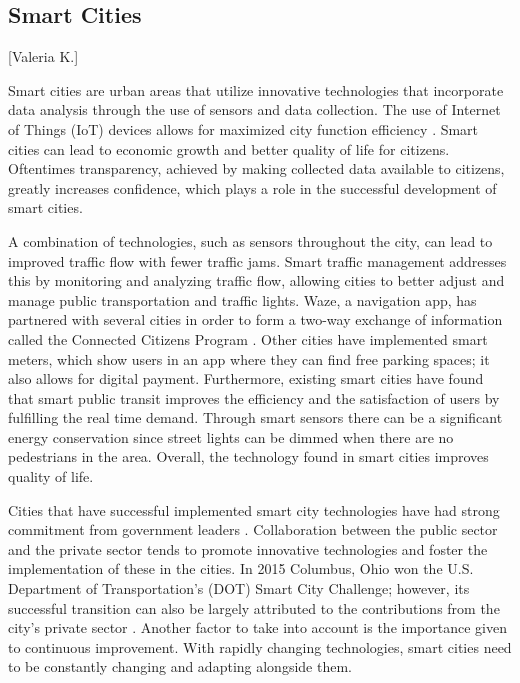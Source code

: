 \documentclass[12pt]{article}                         %
\begin{document}
\subsection{Smart Cities}[Valeria K.]

Smart cities are urban areas that utilize innovative technologies that incorporate data analysis through the use of sensors and data collection. The use of Internet of Things (IoT) devices allows for maximized city function efficiency \cite{MargaretRouseSmartCity}. Smart cities can lead to economic growth and better quality of life for citizens. Oftentimes transparency, achieved by making collected data available to citizens, greatly increases confidence, which plays a role in the successful development of smart cities.

A combination of technologies, such as sensors throughout the city, can lead to improved traffic flow with fewer traffic jams. Smart traffic management addresses this by  monitoring and analyzing traffic flow, allowing cities to better adjust and manage public transportation and traffic lights. Waze, a navigation app, has partnered with several cities in order to form a two-way exchange of information called the Connected Citizens Program \cite{Stern2016WazeMobility}. Other cities have implemented smart meters, which show users in an app where they can find free parking spaces; it also allows for digital payment. Furthermore, existing smart cities have found that smart public transit improves the efficiency and the satisfaction of users by fulfilling the real time demand. Through smart sensors there can be a significant energy conservation since street lights can be dimmed when there are no pedestrians in the area. Overall, the technology found in smart cities improves quality of life.

Cities that have successful implemented smart city technologies have had strong commitment from government leaders \cite{BrianZanghi2017WhyExamples}. Collaboration between the public sector and the private sector tends to promote innovative technologies and foster the implementation of these in the cities. In 2015 Columbus, Ohio won the U.S. Department of Transportation’s (DOT) Smart City Challenge; however, its successful transition can also be largely attributed to the contributions from the city's private sector \cite{FERAN2017SiliconOhio}. Another factor to take into account is the importance given to continuous improvement. With rapidly changing technologies, smart cities need to be constantly changing and adapting alongside them.
\end{document}
